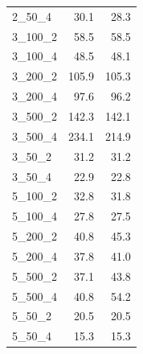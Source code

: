 \begin{tabular}{lrr}
  2\_50\_4 &                                               30.1 &                                               28.3 \\
 3\_100\_2 &                                               58.5 &                                               58.5 \\
 3\_100\_4 &                                               48.5 &                                               48.1 \\
 3\_200\_2 &                                              105.9 &                                              105.3 \\
 3\_200\_4 &                                               97.6 &                                               96.2 \\
 3\_500\_2 &                                              142.3 &                                              142.1 \\
 3\_500\_4 &                                              234.1 &                                              214.9 \\
  3\_50\_2 &                                               31.2 &                                               31.2 \\
  3\_50\_4 &                                               22.9 &                                               22.8 \\
 5\_100\_2 &                                               32.8 &                                               31.8 \\
 5\_100\_4 &                                               27.8 &                                               27.5 \\
 5\_200\_2 &                                               40.8 &                                               45.3 \\
 5\_200\_4 &                                               37.8 &                                               41.0 \\
 5\_500\_2 &                                               37.1 &                                               43.8 \\
 5\_500\_4 &                                               40.8 &                                               54.2 \\
  5\_50\_2 &                                               20.5 &                                               20.5 \\
  5\_50\_4 &                                               15.3 &                                               15.3 \\
\bottomrule
\end{tabular}
